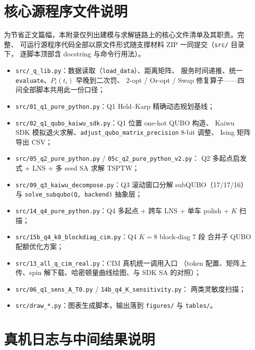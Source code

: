 \documentclass[UTF8,12pt,a4paper]{ctexart}
\begin{document}
\section{核心源程序文件说明}
\label{app:src}

为节省正文篇幅，本附录仅列出建模与求解链路上的核心文件清单及其职责。完整、
可运行源程序代码全部以原文件形式随支撑材料 ZIP 一同提交（\texttt{src/} 目录下，
逐脚本顶部含 docstring 与命令行用法）。

\begin{itemize}[leftmargin=2em,itemsep=0.2ex]
  \item \texttt{src/\_q\_lib.py}：数据读取（\texttt{load\_data}）、距离矩阵、
        服务时间递推、统一 \texttt{evaluate}、$P_i(t_i)$ 早晚到二次罚、
        2-opt / Or-opt / Swap 修复算子——四问全部脚本共用此一份口径；
  \item \texttt{src/01\_q1\_pure\_python.py}：Q1 Held--Karp 精确动态规划基线；
  \item \texttt{src/02\_q1\_qubo\_kaiwu\_sdk.py}：Q1 位置 one-hot QUBO 构造、
        Kaiwu SDK 模拟退火求解、\texttt{adjust\_qubo\_matrix\_precision} 8-bit 调整、
        Ising 矩阵导出 CSV；
  \item \texttt{src/05\_q2\_pure\_python.py} / \texttt{05c\_q2\_pure\_python\_v2.py}：
        Q2 多起点启发式 + LNS + 多 seed SA 求解 TSPTW；
  \item \texttt{src/09\_q3\_kaiwu\_decompose.py}：Q3 滚动窗口分解 subQUBO（17/17/16）
        与 \texttt{solve\_subqubo(Q, backend)} 抽象层；
  \item \texttt{src/14\_q4\_pure\_python.py}：Q4 多起点 + 跨车 LNS + 单车 polish + $K$ 扫描；
  \item \texttt{src/15b\_q4\_k8\_blockdiag\_cim.py}：Q4 $K=8$ block-diag 7 段
        合并子 QUBO 配额优化方案；
  \item \texttt{src/13\_all\_q\_cim\_real.py}：CIM 真机统一调用入口
        （token 配置、矩阵上传、spin 解下载、哈密顿量曲线绘图、与 SDK SA 的对照）；
  \item \texttt{src/06\_q1\_sens\_A\_T0.py} / \texttt{14b\_q4\_K\_sensitivity.py}：
        两类灵敏度扫描；
  \item \texttt{src/draw\_*.py}：图表生成脚本，输出落到 \texttt{figures/} 与 \texttt{tables/}。
\end{itemize}

\section{真机日志与中间结果说明}
\label{app:cim}
\end{document}
